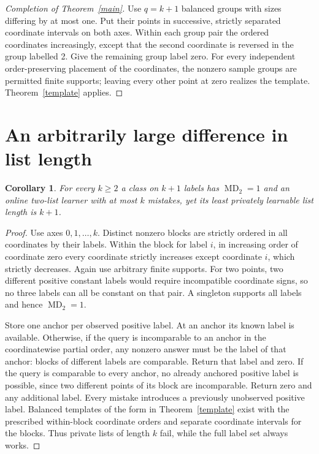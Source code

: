 \documentclass[11pt]{article}
\newtheorem{corollary}[theorem]{Corollary}
\newcommand{\MD}{\operatorname{MD}}
\begin{document}
\begin{proof}[Completion of Theorem~\ref{main}]
Use $q=k+1$ balanced groups with sizes differing by at most one. Put their points in successive, strictly separated coordinate intervals on both axes. Within each group pair the ordered coordinates increasingly, except that the second coordinate is reversed in the group labelled 2. Give the remaining group label zero. For every independent order-preserving placement of the coordinates, the nonzero sample groups are permitted finite supports; leaving every other point at zero realizes the template. Theorem~\ref{template} applies.
\end{proof}

\section{An arbitrarily large difference in list length}
\begin{corollary}\label{gap}
For every $k\ge2$ a class on $k+1$ labels has $\MD_2=1$ and an online two-list learner with at most $k$ mistakes, yet its least privately learnable list length is $k+1$.
\end{corollary}
\begin{proof}
Use axes $0,1,\ldots,k$. Distinct nonzero blocks are strictly ordered in all coordinates by their labels. Within the block for label $i$, in increasing order of coordinate zero every coordinate strictly increases except coordinate $i$, which strictly decreases. Again use arbitrary finite supports. For two points, two different positive constant labels would require incompatible coordinate signs, so no three labels can all be constant on that pair. A singleton supports all labels and hence $\MD_2=1$.

Store one anchor per observed positive label. At an anchor its known label is available. Otherwise, if the query is incomparable to an anchor in the coordinatewise partial order, any nonzero answer must be the label of that anchor: blocks of different labels are comparable. Return that label and zero. If the query is comparable to every anchor, no already anchored positive label is possible, since two different points of its block are incomparable. Return zero and any additional label. Every mistake introduces a previously unobserved positive label. Balanced templates of the form in Theorem~\ref{template} exist with the prescribed within-block coordinate orders and separate coordinate intervals for the blocks. Thus private lists of length $k$ fail, while the full label set always works.
\end{proof}
\end{document}
